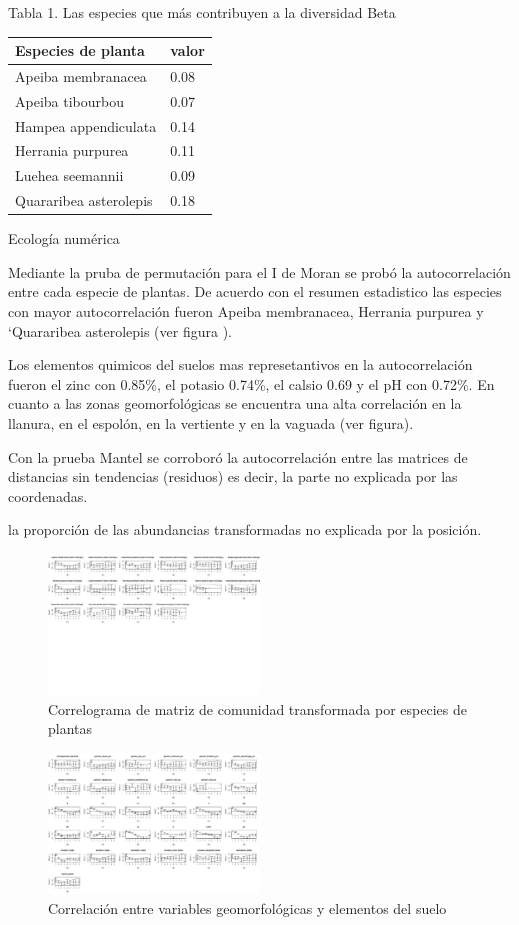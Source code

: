 \documentclass[11pt,]{article}
\begin{document}
Tabla 1. Las especies que más contribuyen a la diversidad Beta

\begin{longtable}[]{@{}ll@{}}
\toprule
Especies de planta & valor\tabularnewline
\midrule
\endhead
Apeiba membranacea & 0.08\tabularnewline
Apeiba tibourbou & 0.07\tabularnewline
Hampea appendiculata & 0.14\tabularnewline
Herrania purpurea & 0.11\tabularnewline
Luehea seemannii & 0.09\tabularnewline
Quararibea asterolepis & 0.18\tabularnewline
\bottomrule
\end{longtable}

Ecología numérica

Mediante la pruba de permutación para el I de Moran se probó la
autocorrelación entre cada especie de plantas. De acuerdo con el resumen
estadistico las especies con mayor autocorrelación fueron Apeiba
membranacea, Herrania purpurea y `Quararibea asterolepis (ver figura ).

Los elementos quimicos del suelos mas represetantivos en la
autocorrelación fueron el zinc con 0.85\%, el potasio 0.74\%, el calsio
0.69 y el pH con 0.72\%. En cuanto a las zonas geomorfológicas se
encuentra una alta correlación en la llanura, en el espolón, en la
vertiente y en la vaguada (ver figura).

Con la prueba Mantel se corroboró la autocorrelación entre las matrices
de distancias sin tendencias (residuos) es decir, la parte no explicada
por las coordenadas.

la proporción de las abundancias transformadas no explicada por la
posición.

\begin{figure}
\centering
\includegraphics[width=0.50000\textwidth]{correlograma_matriz_de_comunidad_transformda.jpg}
\caption{Correlograma de matriz de comunidad transformada por especies
de plantas}
\end{figure}

\begin{figure}
\centering
\includegraphics[width=0.50000\textwidth]{correlacion_matriz_comunidad_geomorofologicas_variables_suelo.jpg}
\caption{Correlación entre variables geomorfológicas y elementos del
suelo}
\end{figure}
\end{document}
